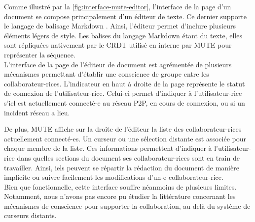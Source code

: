 Comme illustré par la \autoref{fig:interface-mute-editor}, l'interface de la page d'un document se compose principalement d'un éditeur de texte.
Ce dernier supporte le langage de balisage Markdown \cite{2004-markdown}.
Ainsi, l'éditeur permet d'inclure plusieurs éléments légers de style.
Les balises du langage Markdown étant du texte, elles sont répliquées nativement par le \ac{CRDT} utilisé en interne par \ac{MUTE} pour représenter la séquence.\\

L'interface de la page de l'éditeur de document est agrémentée de plusieurs mécanismes permettant d'établir une conscience de groupe entre les collaborateur-rices.
L'indicateur en haut à droite de la page représente le statut de connexion de l'utilisateur-rice.
Celui-ci permet d'indiquer à l'utilisateur-rice s'iel est actuellement connecté-e au réseau \ac{P2P}, en cours de connexion, ou si un incident réseau a lieu.

De plus, \ac{MUTE} affiche sur la droite de l'éditeur la liste des collaborateur-rices actuellement connecté-es.
Un curseur ou une sélection distante est associée pour chaque membre de la liste.
Ces informations permettent d'indiquer à l'utilisateur-rice dans quelles sections du document ses collaborateur-rices sont en train de travailler.
Ainsi, iels peuvent se répartir la rédaction du document de manière implicite ou suivre facilement les modifications d'un-e collaborateur-rice.\\

Bien que fonctionnelle, cette interface souffre néanmoins de plusieurs limites.
Notamment, nous n'avons pas encore pu étudier la littérature concernant les mécanismes de conscience pour supporter la collaboration, au-delà du système de curseurs distants.

